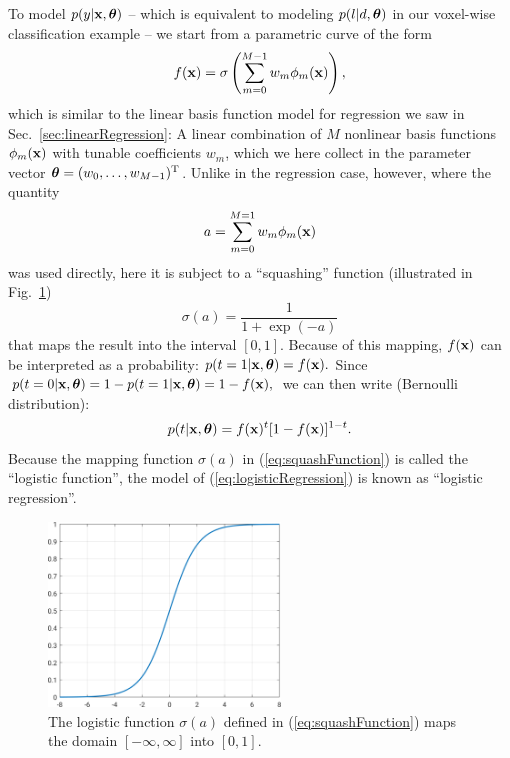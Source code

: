 \documentclass[10pt,twoside]{book}
\begin{document}
To model $p( y | \mathbf{x}, {\mbox{\boldmath {${\theta}$}}} )$
-- which is equivalent to modeling $p( l | d, {\mbox{\boldmath {${\theta}$}}} )$ in our 
voxel-wise classification
example -- 
we start from a parametric curve of the form 
\begin{equation}
  f( \mathbf{x} ) = \sigma\left( \sum_{m=0}^{M-1} w_m \phi_m( \mathbf{x} ) \right),
  \label{eq:logisticRegression}
\end{equation}
which is similar to the linear basis function model for regression we saw in Sec.~\ref{sec:linearRegression}:
A linear combination of $M$ nonlinear basis functions $\phi_m(\mathbf{x})$ with tunable coefficients $w_m$,
which we here collect in the parameter vector ${\mbox{\boldmath {${\theta}$}}} = (w_0,\ldots,w_{M-1})^\mathrm{T}$.
Unlike in the regression case, however, 
where the 
quantity
\begin{equation}
  a = \sum_{m=0}^{M=1} w_m \phi_m( \mathbf{x} )
  \label{eq:activation}
\end{equation}
was used directly,
here it is subject to a ``squashing'' function 
(illustrated in Fig.~\ref{fig:squashFunction})
\begin{equation}
  \sigma( a ) = \frac{1}{1 + \exp(-a)}
  \label{eq:squashFunction}
\end{equation}
that maps the result into the interval $[ 0, 1 ]$.
%
Because of this mapping, $f(\mathbf{x})$ can be interpreted as a probability:
$
  p( t=1 | \mathbf{x}, {\mbox{\boldmath {${\theta}$}}} ) = f( \mathbf{x} )
  .
$
Since 
$
  p( t=0 | \mathbf{x}, {\mbox{\boldmath {${\theta}$}}} ) 
  = 1 - p( t=1 | \mathbf{x}, {\mbox{\boldmath {${\theta}$}}} )
  = 1 - f( \mathbf{x} )
  ,
$
we can then write (Bernoulli distribution):
\begin{equation}
  p( t | \mathbf{x}, {\mbox{\boldmath {${\theta}$}}} ) = f( \mathbf{x} )^t [ 1 - f( \mathbf{x} ) ]^{1-t}
  \label{eq:Bernoulli}
  .
\end{equation}
Because the mapping function $\sigma(a)$ in (\eqref{eq:squashFunction}) is called the ``logistic function'',
the model of (\eqref{eq:logisticRegression}) is known as ``logistic regression''.

\begin{figure}
  \centering
  \includegraphics[width=0.55\textwidth]{logisticFunction} 
  \caption{The logistic function $\sigma(a)$ defined in (\eqref{eq:squashFunction}) maps the domain $[ -\infty, \infty]$ into $[ 0, 1 ]$.}
  \label{fig:squashFunction}
\end{figure}
\end{document}
